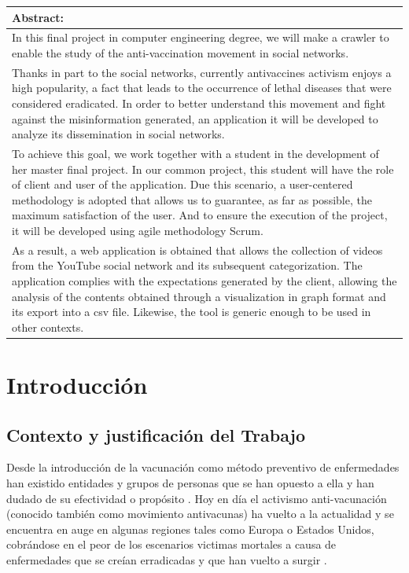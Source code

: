 \documentclass[11pt,a4paper]{article}
\begin{document}
\begin{tabularx}{\textwidth}{|X|}
\hline 
\textbf{Abstract:} \\ 
\hline 
\cellcolor{gray!25}
\medskip
In this final project in computer engineering degree, we will make a crawler to enable the study of the anti-vaccination movement in social networks.
\\
\medskip 
\cellcolor{gray!25}
Thanks in part to the social networks, currently antivaccines activism enjoys a high popularity, a fact that leads to the occurrence of lethal diseases that were considered eradicated. In order to better understand this movement and fight against the misinformation generated, an application it will be developed to analyze its dissemination in social networks.
\\
\medskip 
\cellcolor{gray!25}
To achieve this goal, we work together with a student in the development of her master final project. In our common project, this student will have the role of client and user of the application. Due this scenario, a user-centered methodology is adopted that allows us to guarantee, as far as possible, the maximum satisfaction of the user. And to ensure the execution of the project, it will be developed using agile methodology Scrum.
\\
\medskip 
\cellcolor{gray!25}
As a result, a web application is obtained that allows the collection of videos from the YouTube social network and its subsequent categorization. The application complies with the expectations generated by the client, allowing the analysis of the contents obtained through a visualization in graph format and its export into a csv file. Likewise, the tool is generic enough to be used in other contexts.
\medskip 
\\
\hline 
\end{tabularx} 
\newpage 


\tableofcontents
\newpage


\listoffigures
\newpage


\section{Introducción}
\bigskip 

\subsection{Contexto y justificación del Trabajo}
Desde la introducción de la vacunación como método preventivo de enfermedades han existido entidades y grupos de personas que se han opuesto a ella y han dudado de su efectividad o propósito \cite{1}. Hoy en día el activismo anti-vacunación (conocido también como movimiento antivacunas) ha vuelto a la actualidad y se encuentra en auge en algunas regiones tales como Europa o Estados Unidos, cobrándose en el peor de los escenarios victimas mortales a causa de enfermedades que se creían erradicadas y que han vuelto a surgir \cite{2}\cite{3}.
\\
\end{document}
